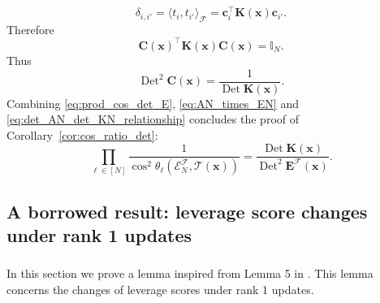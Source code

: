 \documentclass[twoside,11pt]{book}
\numberwithin{theorem}{chapter}
\numberwithin{definition}{chapter}
\numberwithin{proposition}{chapter}
\numberwithin{corollary}{chapter}
\numberwithin{example}{chapter}
\numberwithin{lemma}{chapter}
\DeclareMathOperator{\Det}{Det}
\DeclareMathOperator{\Tran}{\intercal}
\begin{document}
\begin{equation}
  \delta_{i,i'} = \langle t_{i}, t_{i'} \rangle_{\mathcal{F}} = \bm{c}_{i}^{\Tran} \bm{K}(\bm{x}) \bm{c}_{i'}  .
\end{equation}
Therefore
\begin{equation}
\bm{C}(\bm{x})^{\Tran} \bm{K}(\bm{x}) \bm{C}(\bm{x}) = \mathbb{I}_{N}.
\end{equation}
Thus
\begin{equation}\label{eq:det_AN_det_KN_relationship}
\Det^{2} \bm{C}(\bm{x}) = \frac{1}{\Det \bm{K}(\bm{x})}.
\end{equation}
Combining \eqref{eq:prod_cos_det_E}, \eqref{eq:AN_times_EN} and \eqref{eq:det_AN_det_KN_relationship} concludes the proof of Corollary~\ref{cor:cos_ratio_det}:
\begin{equation}
\prod\limits_{\ell \in [N]} \frac{1}{\cos^{2} \theta_{\ell} \left(\mathcal{E}^{\mathcal{F}}_{N}, \mathcal{T}(\bm{x}) \right)} = \frac{\Det \bm{K}(\bm{x})}{\Det^{2} \bm{E}^{\mathcal{F}}(\bm{x})}.
\end{equation}


\subsection{A borrowed result: leverage score changes under rank 1 updates} \label{subsec:lv_score_updates}


\subsubsection{}
In this section we prove a lemma inspired from Lemma 5 in \cite{Coh15}. This lemma concerns the changes of leverage scores under rank 1 updates.
\end{document}
